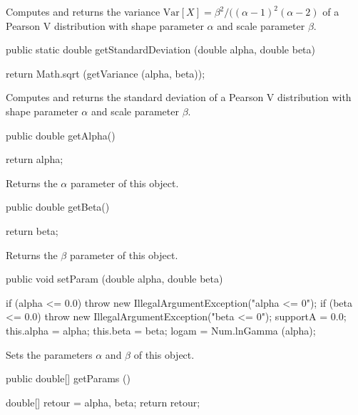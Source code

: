 \begin{tabb}
   Computes and returns the variance $\mbox{Var}[X] = \beta^2 / ((\alpha -
1)^2(\alpha - 2)$
   of a Pearson V distribution with shape parameter $\alpha$ and scale
parameter $\beta$.
\end{tabb}
\begin{code}

   public static double getStandardDeviation (double alpha, double beta)\begin{hide} {
      return Math.sqrt (getVariance (alpha, beta));
   }\end{hide}
\end{code}
\begin{tabb}
   Computes and returns the standard deviation of a Pearson V distribution with
   shape parameter $\alpha$ and scale parameter $\beta$.
\end{tabb}
\begin{code}

   public double getAlpha()\begin{hide} {
      return alpha;
   }\end{hide}
\end{code}
\begin{tabb}
   Returns the $\alpha$ parameter of this object.
\end{tabb}
\begin{code}

   public double getBeta()\begin{hide} {
      return beta;
   }\end{hide}
\end{code}
\begin{tabb}
   Returns the $\beta$ parameter of this object.
\end{tabb}
\begin{code}

   public void setParam (double alpha, double beta)\begin{hide} {
      if (alpha <= 0.0)
         throw new IllegalArgumentException("alpha <= 0");
      if (beta <= 0.0)
         throw new IllegalArgumentException("beta <= 0");
      supportA = 0.0;
      this.alpha = alpha;
      this.beta = beta;
      logam = Num.lnGamma (alpha);
   }\end{hide}
\end{code}
\begin{tabb}
   Sets the parameters $\alpha$ and $\beta$ of this object.
\end{tabb}
\begin{code}

   public double[] getParams ()\begin{hide} {
      double[] retour = {alpha, beta};
      return retour;
   }\end{hide}
\end{code}
